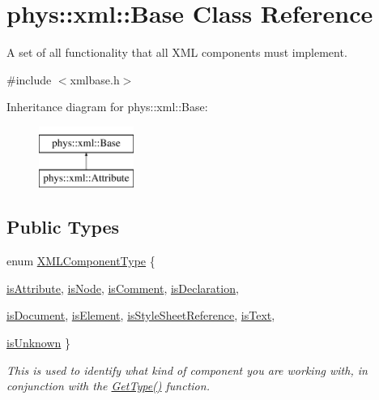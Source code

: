 \hypertarget{classphys_1_1xml_1_1Base}{
\section{phys::xml::Base Class Reference}
\label{df/d10/classphys_1_1xml_1_1Base}
}


A set of all functionality that all XML components must implement.  




{\ttfamily \#include $<$xmlbase.h$>$}

Inheritance diagram for phys::xml::Base:\begin{figure}[H]
\begin{center}
\leavevmode
\includegraphics[height=2cm]{df/d10/classphys_1_1xml_1_1Base}
\end{center}
\end{figure}
\subsection*{Public Types}
\begin{DoxyCompactItemize}
\item 
enum \hyperlink{classphys_1_1xml_1_1Base_a62ba0484b5ecb502f9ae9d82d3720320}{XMLComponentType} \{ \par
\hyperlink{classphys_1_1xml_1_1Base_a62ba0484b5ecb502f9ae9d82d3720320af75393e041247190be1c922d0b3faf07}{isAttribute}, 
\hyperlink{classphys_1_1xml_1_1Base_a62ba0484b5ecb502f9ae9d82d3720320a0a38c5c0a9d182f57db5a6d4a3e68306}{isNode}, 
\hyperlink{classphys_1_1xml_1_1Base_a62ba0484b5ecb502f9ae9d82d3720320a38fcb00bdd7a8786331b6e716b958e95}{isComment}, 
\hyperlink{classphys_1_1xml_1_1Base_a62ba0484b5ecb502f9ae9d82d3720320ae3e48e223c26f696ddeca851a43407ea}{isDeclaration}, 
\par
\hyperlink{classphys_1_1xml_1_1Base_a62ba0484b5ecb502f9ae9d82d3720320ac0126857d5de86b032851a39e0b32cc3}{isDocument}, 
\hyperlink{classphys_1_1xml_1_1Base_a62ba0484b5ecb502f9ae9d82d3720320a334e5f8fbb7ca85f3e371c19b6aefd10}{isElement}, 
\hyperlink{classphys_1_1xml_1_1Base_a62ba0484b5ecb502f9ae9d82d3720320a8d59420a41bc7e19906ffa74390266e8}{isStyleSheetReference}, 
\hyperlink{classphys_1_1xml_1_1Base_a62ba0484b5ecb502f9ae9d82d3720320aba278067c2045c663334b7333c6b5f8f}{isText}, 
\par
\hyperlink{classphys_1_1xml_1_1Base_a62ba0484b5ecb502f9ae9d82d3720320a00d10833cc80d919d22793cb52c20e92}{isUnknown}
 \}
\begin{DoxyCompactList}\small\item\em This is used to identify what kind of component you are working with, in conjunction with the \hyperlink{classphys_1_1xml_1_1Base_af2821c239b5eb31c2524a499bf3ff19f}{GetType()} function. \item\end{DoxyCompactList}\end{DoxyCompactItemize}
